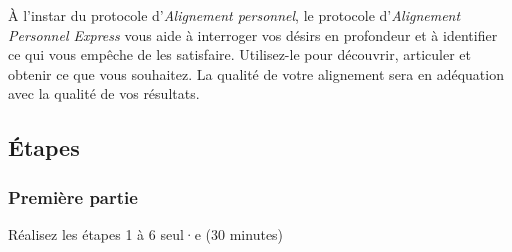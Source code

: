 \documentclass[11pt]{book}
\begin{document}
À l'instar du protocole d'\emph{Alignement personnel}, le protocole d'\emph{Alignement Personnel Express} vous aide à interroger vos désirs en profondeur 
et à identifier ce qui vous empêche de les satisfaire. Utilisez-le pour découvrir, articuler et obtenir ce que vous souhaitez. La qualité de votre 
alignement sera en adéquation avec la qualité de vos résultats.

\subsection{Étapes}

\subsubsection{Première partie}
Réalisez les étapes 1 à 6 seul·e (30 minutes)
\end{document}
